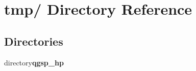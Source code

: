 \section{tmp/ Directory Reference}
\label{dir_000002}
\subsection*{Directories}
\begin{CompactItemize}
\item 
directory{\bf qgsp\_\-hp}
\end{CompactItemize}
